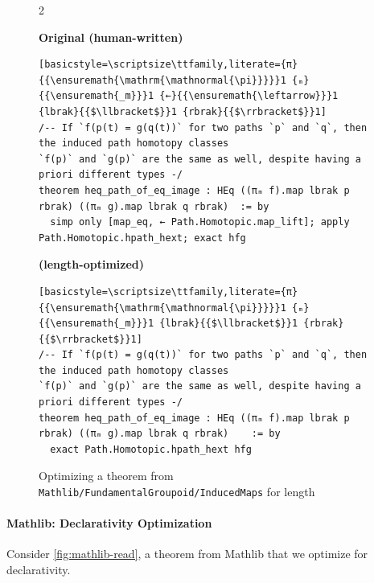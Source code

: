\setlength{\columnsep}{0.2cm}
\begin{figure}[ht]
\begin{multicols}{2}

{
\textbf{Original (human-written)}
\begin{scriptsize}
\begin{lstlisting}[basicstyle=\scriptsize\ttfamily,literate={π}{{\ensuremath{\mathrm{\mathnormal{\pi}}}}}1 {ₘ}{{\ensuremath{_m}}}1 {←}{{\ensuremath{\leftarrow}}}1 {lbrak}{{$\llbracket$}}1 {rbrak}{{$\rrbracket$}}1]
/-- If `f(p(t) = g(q(t))` for two paths `p` and `q`, then the induced path homotopy classes
`f(p)` and `g(p)` are the same as well, despite having a priori different types -/
theorem heq_path_of_eq_image : HEq ((πₘ f).map lbrak p rbrak) ((πₘ g).map lbrak q rbrak)  := by
  simp only [map_eq, ← Path.Homotopic.map_lift]; apply Path.Homotopic.hpath_hext; exact hfg
\end{lstlisting}
\end{scriptsize}
}
\vfill\null
\columnbreak
{
\textbf{\methodname{} (length-optimized)}
\begin{scriptsize}
\begin{lstlisting}[basicstyle=\scriptsize\ttfamily,literate={π}{{\ensuremath{\mathrm{\mathnormal{\pi}}}}}1 {ₘ}{{\ensuremath{_m}}}1 {lbrak}{{$\llbracket$}}1 {rbrak}{{$\rrbracket$}}1]
/-- If `f(p(t) = g(q(t))` for two paths `p` and `q`, then the induced path homotopy classes
`f(p)` and `g(p)` are the same as well, despite having a priori different types -/
theorem heq_path_of_eq_image : HEq ((πₘ f).map lbrak p rbrak) ((πₘ g).map lbrak q rbrak)    := by
  exact Path.Homotopic.hpath_hext hfg
\end{lstlisting}
\end{scriptsize}
}
\end{multicols}
\vspace{-2.5em}
\caption{Optimizing a theorem from \texttt{Mathlib/FundamentalGroupoid/InducedMaps} for length}
\vspace{-1em}
\label{fig:mathlib-len}
\end{figure}


\vspace{15px}
\paragraph{Mathlib: Declarativity Optimization} 

Consider \autoref{fig:mathlib-read}, a theorem from Mathlib that we optimize for declarativity. 

